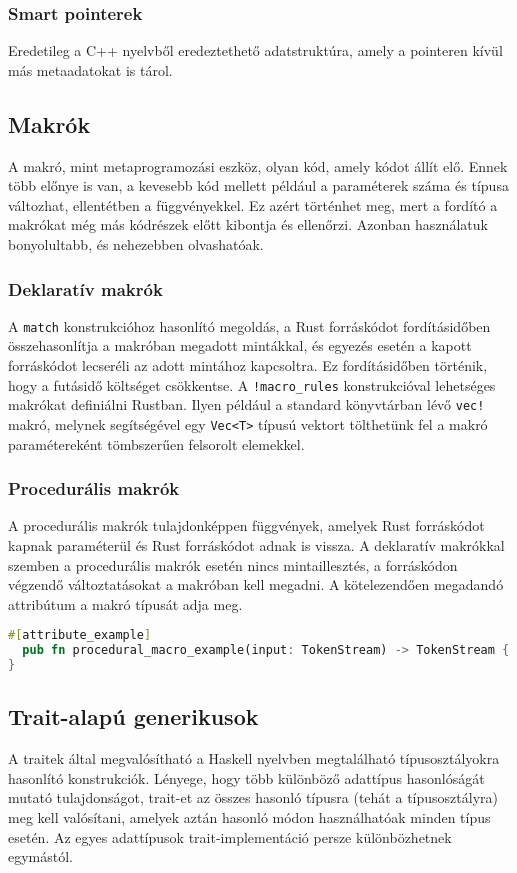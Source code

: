 \subsubsection{Smart pointerek}
Eredetileg a C++ nyelvből eredeztethető adatstruktúra, amely a pointeren kívül más metaadatokat is tárol.

\subsection{Makrók}
A makró, mint metaprogramozási eszköz, olyan kód, amely kódot állít elő. Ennek több előnye is van, a kevesebb kód mellett például a paraméterek száma és típusa változhat, ellentétben a függvényekkel. Ez azért történhet meg, mert a fordító a makrókat még más kódrészek előtt kibontja és ellenőrzi. Azonban használatuk bonyolultabb, és nehezebben olvashatóak.

\subsubsection{Deklaratív makrók}
A \lstinline{match} konstrukcióhoz hasonlító megoldás, a Rust forráskódot fordításidőben összehasonlítja a makróban megadott mintákkal, és egyezés esetén a kapott forráskódot lecseréli az adott mintához kapcsoltra. Ez fordításidőben történik, hogy a futásidő költséget csökkentse. A \lstinline{!macro_rules} konstrukcióval lehetséges makrókat definiálni Rustban. Ilyen például a standard könyvtárban lévő \lstinline{vec!} makró, melynek segítségével egy \lstinline{Vec<T>} típusú vektort tölthetünk fel a makró paramétereként tömbszerűen felsorolt elemekkel.

\subsubsection{Procedurális makrók}
A procedurális makrók tulajdonképpen függvények, amelyek Rust forráskódot kapnak paraméterül és Rust forráskódot adnak is vissza. A deklaratív makrókkal szemben a procedurális makrók esetén nincs mintaillesztés, a forráskódon végzendő változtatásokat a makróban kell megadni. A kötelezendően megadandó attribútum a makró típusát adja meg.
\begin{lstlisting}[language=Rust, style=boxed]
#[attribute_example]
  pub fn procedural_macro_example(input: TokenStream) -> TokenStream {
}
\end{lstlisting}

\subsection{Trait-alapú generikusok}
A traitek által megvalósítható a Haskell nyelvben megtalálható típusosztályokra hasonlító konstrukciók. Lényege, hogy több különböző adattípus hasonlóságát mutató tulajdonságot, trait-et az összes hasonló típusra (tehát a típusosztályra) meg kell valósítani, amelyek aztán hasonló módon használhatóak minden típus esetén. Az egyes adattípusok trait-implementáció persze különbözhetnek egymástól.

